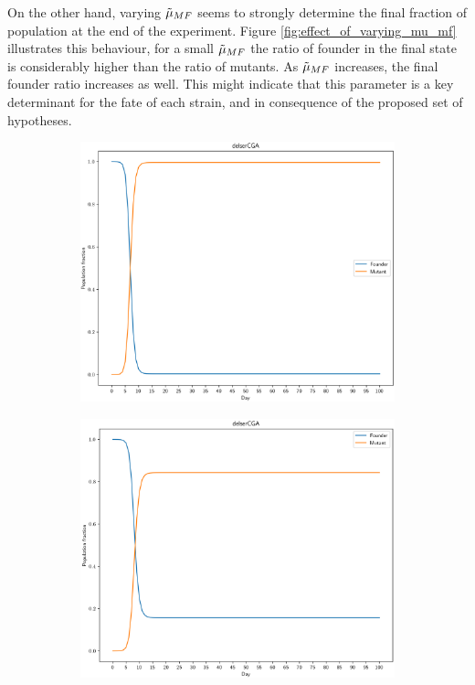 \documentclass{article}
\begin{document}
On the other hand, varying $\Tilde{\mu}_{MF}$ seems to strongly determine the final fraction of population at the end of the experiment. Figure \ref{fig:effect_of_varying_mu_mf} illustrates this behaviour, for a small $\Tilde{\mu}_{MF}$ the ratio of founder in the final state is considerably higher than the ratio of mutants. As $\Tilde{\mu}_{MF}$ increases, the final founder ratio increases as well. This might indicate that this parameter is a key determinant for the fate of each strain, and in consequence of the proposed set of hypotheses. 

\begin{figure}
    \centering
    \begin{subfigure}[b]{0.4\textwidth}
    \centering
    \includegraphics[scale=0.4]{plots/two_state_small_mu_mf.png}
    \end{subfigure}
    \hfill
    \begin{subfigure}[b]{0.4\textwidth}
    \centering
    \includegraphics[scale=0.4]{plots/two_state_big_mu_mf.png}

\end{subfigure}
\end{figure}
\end{document}
